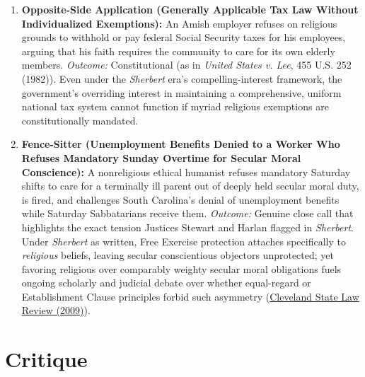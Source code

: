 \documentclass[12pt]{article}
\begin{document}
\begin{enumerate}
\item \textbf{Opposite-Side Application (Generally Applicable Tax Law Without Individualized Exemptions):} An Amish employer refuses on religious grounds to withhold or pay federal Social Security taxes for his employees, arguing that his faith requires the community to care for its own elderly members. \textit{Outcome:} Constitutional (as in \textit{United States v. Lee}, 455 U.S. 252 (1982)). Even under the \textit{Sherbert} era's compelling-interest framework, the government's overriding interest in maintaining a comprehensive, uniform national tax system cannot function if myriad religious exemptions are constitutionally mandated.

\item \textbf{Fence-Sitter (Unemployment Benefits Denied to a Worker Who Refuses Mandatory Sunday Overtime for Secular Moral Conscience):} A nonreligious ethical humanist refuses mandatory Saturday shifts to care for a terminally ill parent out of deeply held secular moral duty, is fired, and challenges South Carolina's denial of unemployment benefits while Saturday Sabbatarians receive them. \textit{Outcome:} Genuine close call that highlights the exact tension Justices Stewart and Harlan flagged in \textit{Sherbert}. Under \textit{Sherbert} as written, Free Exercise protection attaches specifically to \textit{religious} beliefs, leaving secular conscientious objectors unprotected; yet favoring religious over comparably weighty secular moral obligations fuels ongoing scholarly and judicial debate over whether equal-regard or Establishment Clause principles forbid such asymmetry (\href{https://engagedscholarship.csuohio.edu/cgi/viewcontent.cgi?article=1116&context=clevstlrev}{Cleveland State Law Review (2009)}).
\end{enumerate}

\section{Critique}
\end{document}
